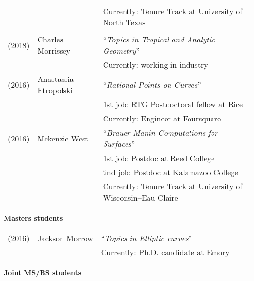 \documentclass[margin,line]{res}
\newcommand{\defi}[1]{\textsf{#1}} 				%
\begin{document}
\begin{resume}
\begin{tabular}{lll}
         && \hspace{4 pt} Currently: Tenure Track at University of North Texas\\ 
    \vspace{4pt}\\
  (2018) & \defi{Charles Morrissey} &   ``\emph{Topics in Tropical and Analytic Geometry}'' \\
         && \hspace{4 pt} Currently: working in industry
    \vspace{4pt}\\
  (2016) & \defi{Anastassia Etropolski} &   ``\emph{Rational Points on Curves}'' \\
         && \hspace{4 pt} 1st job: RTG Postdoctoral fellow at Rice \\
         && \hspace{4 pt} Currently: Engineer at Foursquare
    \vspace{4pt}\\
  (2016) & \defi{Mckenzie West} &   ``\emph{Brauer-Manin Computations for Surfaces}'' \\
         && \hspace{4 pt} 1st job: Postdoc at Reed College\\
         &&  \hspace{4 pt} 2nd job: Postdoc at Kalamazoo College \\
         && \hspace{4 pt} Currently: Tenure Track at University of Wisconsin--Eau Claire



\end{tabular}

{\bf Masters students}

\vspace*{-.15in}

\begin{tabular}{lll}
  (2016) &  Jackson Morrow & ``\emph{Topics in Elliptic curves}'' \\
  & & Currently: Ph.D.  candidate at Emory
\end{tabular}

  
{\bf Joint MS/BS students}
\vspace*{-.15in}


\end{resume}
\end{document}
